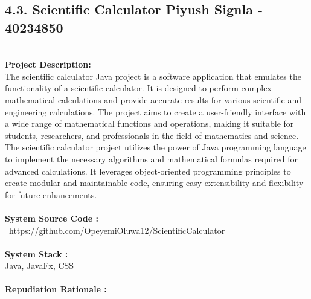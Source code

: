 \documentclass[letterpaper, 11pt]{report}
\begin{document}
\subsection*{4.3. Scientific Calculator  \hfill {\normalsize{Piyush Signla - 40234850}}} \\
\normalsize {\textbf{Project Description:}} \\
\normalsize {The scientific calculator Java project is a software application that emulates the functionality of a scientific calculator. It is designed to perform complex mathematical calculations and provide accurate results for various scientific and engineering calculations. The project aims to create a user-friendly interface with a wide range of mathematical functions and operations, making it suitable for students, researchers, and professionals in the field of mathematics and science. The scientific calculator project utilizes the power of Java programming language to implement the necessary algorithms and mathematical formulas required for advanced calculations. It leverages object-oriented programming principles to create modular and maintainable code, ensuring easy extensibility and flexibility for future enhancements.}\\
\\
\normalsize{\textbf{System Source Code :}} \\
\normalsize{\ https://github.com/OpeyemiOluwa12/ScientificCalculator}\\
\\
\normalsize{\textbf{System Stack :}}\\
\normalsize{Java, JavaFx, CSS}\\
\\
\normalsize{\textbf{Repudiation Rationale : }}\\
\end{document}
